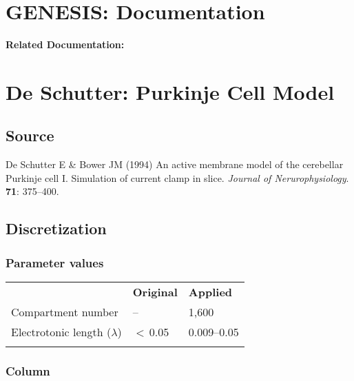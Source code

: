 \documentclass[12pt]{article}
\begin{document}
\section*{GENESIS: Documentation}

{\bf Related Documentation:}

\section*{De Schutter: Purkinje Cell Model}

\subsection*{Source}

De Schutter E \& Bower JM (1994) An active membrane model of the cerebellar Purkinje cell I. Simulation of current clamp in slice. {\it Journal of Nerurophysiology}. {\bf 71}: 375--400.

\subsection*{Discretization}

\subsubsection*{Parameter values}

\begin{tabular}{ l l l }
                                                                  & {\bf Original}                                   & {\bf Applied}  \\
  Compartment number                        & --                                                       & 1,600              \\
  Electrotonic length ($\lambda$)       & $<$\,0.05\,\cite{W:1966ve}          & 0.009--0.05    \\
                                                                  &                                                          &                          \\
\end{tabular}

\subsubsection*{Column}
\end{document}
